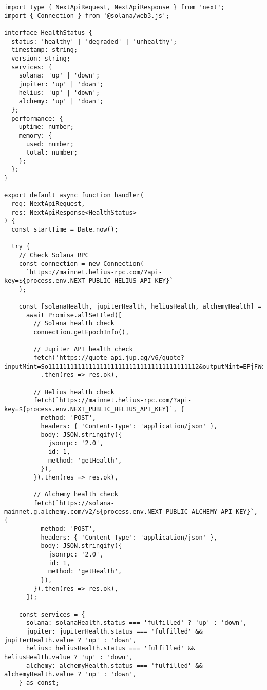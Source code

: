 \documentclass[11pt,a4paper]{article}
\begin{document}
\begin{lstlisting}[style=bash, caption=pages/api/health.ts]
import type { NextApiRequest, NextApiResponse } from 'next';
import { Connection } from '@solana/web3.js';

interface HealthStatus {
  status: 'healthy' | 'degraded' | 'unhealthy';
  timestamp: string;
  version: string;
  services: {
    solana: 'up' | 'down';
    jupiter: 'up' | 'down';
    helius: 'up' | 'down';
    alchemy: 'up' | 'down';
  };
  performance: {
    uptime: number;
    memory: {
      used: number;
      total: number;
    };
  };
}

export default async function handler(
  req: NextApiRequest,
  res: NextApiResponse<HealthStatus>
) {
  const startTime = Date.now();
  
  try {
    // Check Solana RPC
    const connection = new Connection(
      `https://mainnet.helius-rpc.com/?api-key=${process.env.NEXT_PUBLIC_HELIUS_API_KEY}`
    );
    
    const [solanaHealth, jupiterHealth, heliusHealth, alchemyHealth] = 
      await Promise.allSettled([
        // Solana health check
        connection.getEpochInfo(),
        
        // Jupiter API health check
        fetch('https://quote-api.jup.ag/v6/quote?inputMint=So11111111111111111111111111111111111111112&outputMint=EPjFWdd5AufqSSqeM2qN1xzybapC8G4wEGGkZwyTDt1v&amount=1000000000')
          .then(res => res.ok),
        
        // Helius health check
        fetch(`https://mainnet.helius-rpc.com/?api-key=${process.env.NEXT_PUBLIC_HELIUS_API_KEY}`, {
          method: 'POST',
          headers: { 'Content-Type': 'application/json' },
          body: JSON.stringify({
            jsonrpc: '2.0',
            id: 1,
            method: 'getHealth',
          }),
        }).then(res => res.ok),
        
        // Alchemy health check
        fetch(`https://solana-mainnet.g.alchemy.com/v2/${process.env.NEXT_PUBLIC_ALCHEMY_API_KEY}`, {
          method: 'POST',
          headers: { 'Content-Type': 'application/json' },
          body: JSON.stringify({
            jsonrpc: '2.0',
            id: 1,
            method: 'getHealth',
          }),
        }).then(res => res.ok),
      ]);
    
    const services = {
      solana: solanaHealth.status === 'fulfilled' ? 'up' : 'down',
      jupiter: jupiterHealth.status === 'fulfilled' && jupiterHealth.value ? 'up' : 'down',
      helius: heliusHealth.status === 'fulfilled' && heliusHealth.value ? 'up' : 'down',
      alchemy: alchemyHealth.status === 'fulfilled' && alchemyHealth.value ? 'up' : 'down',
    } as const;
    

\end{lstlisting}
\end{document}
